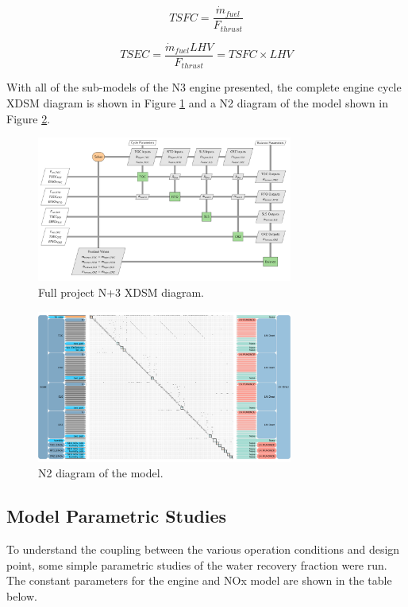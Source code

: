 \documentclass[12pt]{article}
\begin{document}
\begin{equation}
    TSFC = \frac{\Dot{m}_{fuel}}{F_{thrust}}
\end{equation}

\begin{equation}
    TSEC = \frac{\Dot{m}_{fuel} LHV}{F_{thrust}} = TSFC \times LHV
\end{equation}

\noindent
With all of the sub-models of the N3 engine presented, the complete engine cycle XDSM diagram is shown in Figure \ref{fig:N3_xdsm_full} and a N2 diagram of the model shown in Figure \ref{fig:N3_n2}.

\begin{figure}[!hbt]
    \centering
    \includegraphics[width=0.75\textwidth]{N3_xdsm_full.pdf}
    \caption{Full project N+3 XDSM diagram.}
    \label{fig:N3_xdsm_full}
\end{figure}

\begin{figure}[!hbt]
    \centering
    \includegraphics[width=0.75\textwidth]{N3_CLVR_n2.pdf}
    \caption{N2 diagram of the model.}
    \label{fig:N3_n2}
\end{figure}

\subsection{Model Parametric Studies}
To understand the coupling between the various operation conditions and design point, some simple parametric studies of the water recovery fraction were run.
The constant parameters for the engine and NOx model are shown in the table below.
\end{document}
